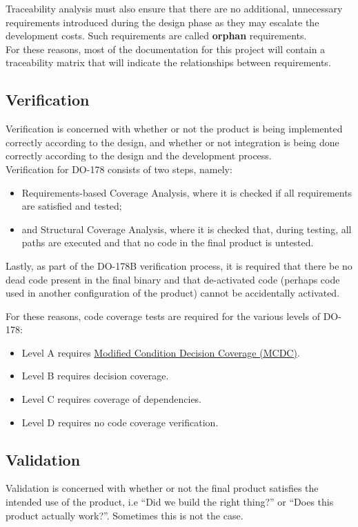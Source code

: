 \documentclass[11pt]{article}
\begin{document}
Traceability analysis must also ensure that there are no additional, unnecessary requirements introduced during the design phase as they may escalate the development costs. Such requirements are called \textbf{orphan} requirements. \\

For these reasons, most of the documentation for this project will contain a traceability matrix that will indicate the relationships between requirements.

\subsection{Verification}\label{subsec:verification}
Verification is concerned with whether or not the product is being implemented correctly according to the design, and whether or not integration is  being done correctly according to the design and the development process. \\

Verification for DO-178 consists of two steps, namely:
\begin{itemize}
\item Requirements-based Coverage Analysis, where it is checked if all requirements are satisfied and tested;
\item and Structural Coverage Analysis, where it is checked that, during testing, all paths are executed and that no code in the final product is untested.
\end{itemize}

Lastly, as part of the DO-178B verification process, it is required that there be no dead code present in the final binary and that de-activated code (perhaps code used in another configuration of the product) cannot be accidentally activated.

For these reasons, code coverage tests are required for the various levels of DO-178:
\begin{itemize}
\item Level A requires \href{https://en.wikipedia.org/wiki/Modified_condition/decision_coverage}{Modified Condition Decision Coverage (MCDC)}.
\item Level B requires decision coverage.
\item Level C requires coverage of dependencies.
\item Level D requires no code coverage verification.
\end{itemize}

\subsection{Validation}
Validation is concerned with whether or not the final product satisfies the intended use of the product, i.e \enquote{Did we build the right thing?} or \enquote{Does this product actually work?}. Sometimes this is not the case.
\end{document}
